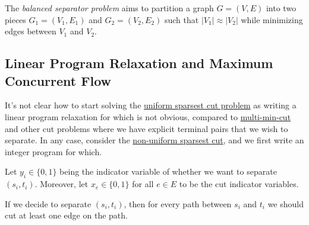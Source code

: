 \begin{problem}\label{prb:balanced-separator}
The \emph{balanced separator problem} aims to partition a graph \(G = (V, E)\) into two pieces \(G_1 = (V_1, E_1)\) and \(G_2 = (V_2, E_2)\) such that \(\lvert V_1 \rvert \approx \lvert V_2 \rvert \) while minimizing edges between \(V_1\) and \(V_2\).
\end{problem}

\subsection{Linear Program Relaxation and Maximum Concurrent Flow}
It's not clear how to start solving the \hyperref[prb:sparsest-cut]{uniform sparsest cut problem} as writing a linear program relaxation for which is not obvious, compared to \hyperref[prb:multi-min-cut]{multi-min-cut} and other cut problems where we have explicit terminal pairs that we wish to separate. In any case, consider the \hyperref[prb:non-uniform-sparsest-cut]{non-uniform sparsest cut}, and we first write an integer program for which.





Let \(y_i \in \{ 0, 1 \} \) being the indicator variable of whether we want to separate \((s_i, t_i)\). Moreover, let \(x_e \in \{ 0, 1 \} \) for all \(e \in E\) to be the cut indicator variables.

\begin{intuition}
	If we decide to separate \((s_i, t_i)\), then for every path between \(s_i\) and \(t_i\) we should cut at least one edge on the path.
\end{intuition}

